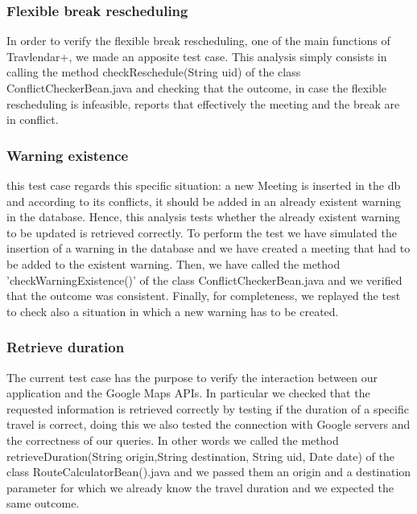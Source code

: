 \subsubsection{Flexible break rescheduling}
In order to verify the flexible break rescheduling, one of the main functions of Travlendar+, we made an apposite test case. This analysis simply consists in calling the method checkReschedule(String uid) of the class ConflictCheckerBean.java and checking that the outcome, in case the flexible rescheduling is infeasible, reports that effectively the meeting and the break are in conflict. 

\subsubsection{Warning existence }
this test case regards this specific situation: a new Meeting is inserted in the db and according to its conflicts, it should be added in an already existent warning in the database.  Hence, this analysis tests whether the already existent warning to be updated is retrieved correctly. To perform the test we have simulated the insertion of a warning in the database and we have created a meeting that had to be added to the existent warning. Then, we have called the method 'checkWarningExistence()' of the class ConflictCheckerBean.java and we verified that the outcome was consistent. 
Finally, for completeness, we replayed the test to check also a situation in which a new warning has to be created. 

\subsubsection{Retrieve duration}
The current test case has the purpose to verify the interaction between our application and the Google Maps APIs. In particular we checked that the requested information is retrieved correctly by testing if the duration of a specific travel is correct, doing this we also tested the connection with Google servers and the correctness of our queries. 
In other words we called the method retrieveDuration(String origin,String destination, String uid, Date date)  of the class RouteCalculatorBean().java and we passed them an origin and a destination parameter for which we already know the travel duration and we expected the same outcome. 
